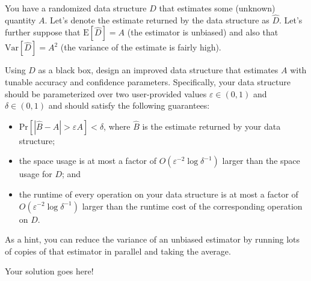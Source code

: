 \documentclass[12pt]{exam}
\newcommand*{\prob}[1]{\text{Pr} \left[ #1 \right]}
\newcommand*{\ex}[1]{\text{E} \left[ #1 \right]}
\newcommand*{\var}[1]{\text{Var} \left[ #1 \right]}
\begin{document}
\begin{questions}
You have a randomized data structure $D$ that estimates some (unknown) quantity $A$. Let's denote the estimate returned by the data structure as $\hat{D}$. Let's further suppose that $\ex{\hat{D}} = A$ (the estimator is unbiased) and also that $\var{\hat{D}} = A^2$ (the variance of the estimate is fairly high).

Using $D$ as a black box, design an improved data structure that estimates $A$ with tunable accuracy and confidence parameters. Specifically, your data structure should be parameterized over two user-provided values $\varepsilon \in (0, 1)$ and $\delta \in (0, 1)$ and should satisfy the following guarantees:
\begin{itemize}
    \item $\prob{|\hat{B} - A| > \varepsilon A} < \delta$, where $\hat{B}$ is the estimate returned by your data structure;
    \item the space usage is at most a factor of $O(\varepsilon^{-2} \log \delta^{-1})$ larger than the space usage for $D$; and
    \item the runtime of every operation on your data structure is at most a factor of $O(\varepsilon^{-2} \log \delta^{-1})$ larger than the runtime cost of the corresponding operation on $D$.
\end{itemize}
As a hint, you can reduce the variance of an unbiased estimator by running lots of copies of that estimator in parallel and taking the average.

\begin{solution}
Your solution goes here!
\end{solution}

\end{questions}
\end{document}
